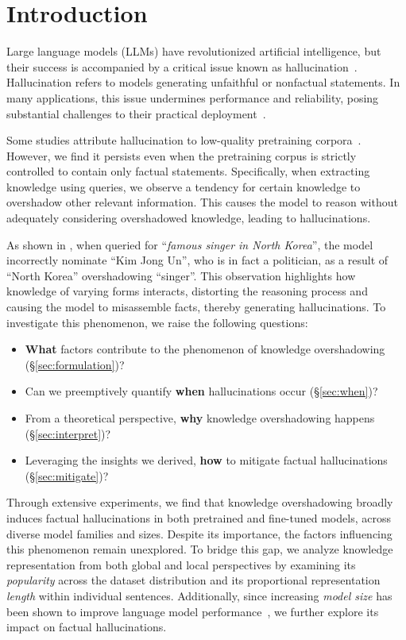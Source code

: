 \section{Introduction}
Large language models (LLMs) have revolutionized artificial intelligence, but their success is accompanied by a critical issue known as hallucination~\cite{ye2023cognitive}. Hallucination refers to models generating unfaithful or nonfactual statements. In many applications, this issue undermines performance and reliability, posing substantial challenges to their practical deployment~\cite{li2024dawn}.



Some studies attribute hallucination to low-quality pretraining corpora~\cite{gehman-etal-2020-realtoxicityprompts}. However, we find it persists even when the pretraining corpus is strictly controlled to contain only factual statements. Specifically, when extracting knowledge using queries, we observe a tendency for certain knowledge to overshadow other relevant information. This causes the model to reason without adequately considering overshadowed knowledge, leading to hallucinations.


As shown in , when queried for ``\textit{famous singer in North Korea}'', the model incorrectly nominate ``Kim Jong Un'', who is in fact a politician, as a result of ``North Korea'' overshadowing ``singer''. This observation highlights how knowledge of varying forms interacts, distorting the reasoning process and causing the model to misassemble facts, thereby generating hallucinations. To investigate this phenomenon, we raise the following questions:
\begin{itemize}[topsep=2pt, partopsep=-5pt, leftmargin=8pt, itemsep=-4.5pt]
\item \textbf{What} factors contribute to the phenomenon of knowledge overshadowing (\S\ref{sec:formulation})?
\item Can we preemptively quantify \textbf{when} hallucinations occur (\S\ref{sec:when})?
\item From a theoretical perspective, \textbf{why} knowledge overshadowing happens (\S\ref{sec:interpret})?
\item Leveraging the insights we derived, \textbf{how} to mitigate factual hallucinations (\S\ref{sec:mitigate})?
\end{itemize}


Through extensive experiments, we find that knowledge overshadowing broadly induces factual hallucinations in both pretrained and fine-tuned models, across diverse model families and sizes. Despite its importance, the factors influencing this phenomenon remain unexplored. To bridge this gap, we analyze knowledge representation from both global and local perspectives by examining its \textit{popularity} across the dataset distribution and its proportional representation \textit{length} within individual sentences. Additionally, since increasing \textit{model size} has been shown to improve language model performance~\cite{kaplan2020scaling}, we further explore its impact on factual hallucinations.


